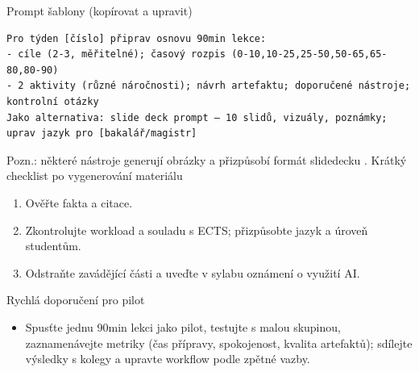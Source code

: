 \medskip
Prompt šablony (kopírovat a upravit)
\begin{verbatim}
Pro týden [číslo] připrav osnovu 90min lekce:
- cíle (2-3, měřitelné); časový rozpis (0-10,10-25,25-50,50-65,65-80,80-90)
- 2 aktivity (různé náročnosti); návrh artefaktu; doporučené nástroje; kontrolní otázky
Jako alternativa: slide deck prompt — 10 slidů, vizuály, poznámky; uprav jazyk pro [bakalář/magistr]
\end{verbatim}
Pozn.: některé nástroje generují obrázky a přizpůsobí formát slidedecku \cite{kb_ai_101_tipu_pdf_04e4a115_page_51_1}.
\medskip
Krátký checklist po vygenerování materiálu
\begin{enumerate}
\item Ověřte fakta a citace.
\item Zkontrolujte workload a souladu s ECTS; přizpůsobte jazyk a úroveň studentům.
\item Odstraňte zavádějící části a uveďte v sylabu oznámení o využití AI.
\end{enumerate}
\medskip
Rychlá doporučení pro pilot
\begin{itemize}
\item Spusťte jednu 90min lekci jako pilot, testujte s malou skupinou, zaznamenávejte metriky (čas přípravy, spokojenost, kvalita artefaktů); sdílejte výsledky s kolegy a upravte workflow podle zpětné vazby.
\end{itemize}